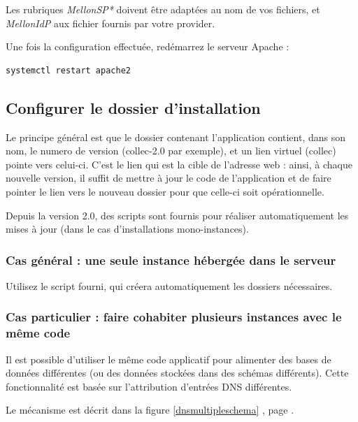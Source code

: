Les rubriques \textit{MellonSP*} doivent être adaptées au nom de vos fichiers, et \textit{MellonIdP} aux fichier fournis par votre provider.

Une fois la configuration effectuée, redémarrez le serveur Apache :
\begin{lstlisting}
systemctl restart apache2
\end{lstlisting}

\subsection{Configurer le dossier d'installation}

Le principe général est que le dossier contenant l'application contient, dans son nom, le numero de version (collec-2.0 par exemple), et un lien virtuel (collec) pointe vers celui-ci. C'est le lien qui est la cible de l'adresse web : ainsi, à chaque nouvelle version, il suffit de mettre à jour le code de l'application et de faire pointer le lien vers le nouveau dossier pour que celle-ci soit opérationnelle.

Depuis la version 2.0, des scripts sont fournis pour réaliser automatiquement les mises à jour (dans le cas d'installations mono-instances).

\subsubsection{Cas général : une seule instance hébergée dans le serveur}

Utilisez le script fourni, qui créera automatiquement les dossiers nécessaires. 


\subsubsection{Cas particulier : faire cohabiter plusieurs instances avec le même code}
\label{dnsmultiple}
Il est possible d'utiliser le même code applicatif pour alimenter des bases de données différentes (ou des données stockées dans des schémas différents). Cette fonctionnalité est basée sur l'attribution d'entrées DNS différentes. 

Le mécanisme est décrit dans la figure \ref{dnsmultipleschema} \textit{}, page \pageref{dnsmultipleschema}.

